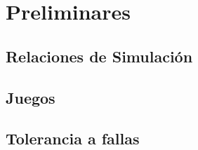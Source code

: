 \chapter{Preliminares}
\label{cap:preliminares}
\section{Relaciones de Simulación}
\section{Juegos}
\section{Tolerancia a fallas}
